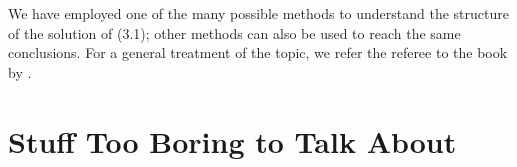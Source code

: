 \documentclass[12pt]{report}   %
\newcommand{\Ndg}{\tilde{N}_g}
\begin{document}
% 
% 
We have employed one of the many possible methods to understand the structure of the solution of (3.1); other methods can also be used to reach the same conclusions.
For a general treatment of the topic, we refer the referee to the book by \cite{Hinch1991}. %

%
\clearpage{\pagestyle{empty}\cleardoublepage}

\chapter{Stuff Too Boring to Talk About}
%
\clearpage{\pagestyle{empty}\cleardoublepage}



\begin{spacing}{0.9}
  
\end{spacing}
\end{document}
